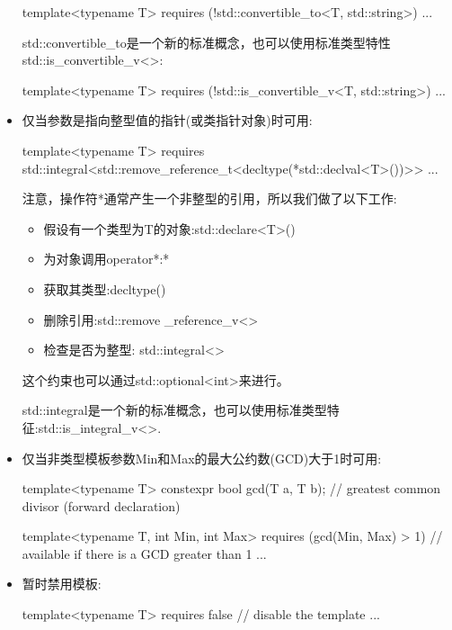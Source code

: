 \begin{itemize}
\begin{cpp}
template<typename T>
requires (!std::convertible_to<T, std::string>)
...
\end{cpp}

std::convertible\_to是一个新的标准概念，也可以使用标准类型特性std::is\_convertible\_v<>:

\begin{cpp}
template<typename T>
requires (!std::is_convertible_v<T, std::string>)
...
\end{cpp}

\item
仅当参数是指向整型值的指针(或类指针对象)时可用:

\begin{cpp}
template<typename T>
requires std::integral<std::remove_reference_t<decltype(*std::declval<T>())>>
...
\end{cpp}

注意，操作符*通常产生一个非整型的引用，所以我们做了以下工作:

\begin{itemize}
\item
假设有一个类型为T的对象:std::declare<T>()

\item
为对象调用operator*:*

\item
获取其类型:decltype()

\item
删除引用:std::remove \_reference\_v<>

\item
检查是否为整型: std::integral<>
\end{itemize}

这个约束也可以通过std::optional<int>来进行。

std::integral是一个新的标准概念，也可以使用标准类型特征:std::is\_integral\_v<>.

\item
仅当非类型模板参数Min和Max的最大公约数(GCD)大于1时可用:

\begin{cpp}
template<typename T>
constexpr bool gcd(T a, T b); // greatest common divisor (forward declaration)

template<typename T, int Min, int Max>
requires (gcd(Min, Max) > 1) // available if there is a GCD greater than 1
...
\end{cpp}

\item
暂时禁用模板:

\begin{cpp}
template<typename T>
requires false // disable the template
...
\end{cpp}
\end{itemize}


